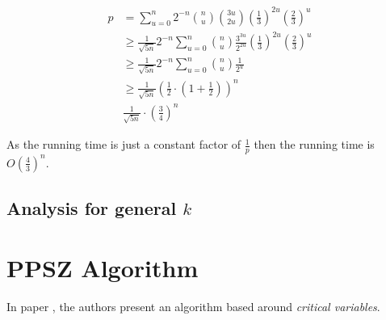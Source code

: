 \documentclass[12pt, a4paper]{article}
\theoremstyle{definition}
\begin{document}
\begin{align}
	p 	&= \sum_{u = 0}^{n} 2^{-n} \binom{n}{u} \binom{3u}{2u} \left( \frac{1}{3} \right)^{2u} \left( \frac{2}{3} \right)^u \\
	 	&\geq \frac{1}{\sqrt{5n}} 2^{-n}\sum_{u = 0}^{n} \binom{n}{u} \frac{3^{3u}}{2^{2u}} \left( \frac{1}{3} \right)^{2u} \left( \frac{2}{3} \right)^u \\
	 	&\geq \frac{1}{\sqrt{5n}} 2^{-n}\sum_{u = 0}^{n} \binom{n}{u} \frac{1}{2^u} \\
	 	&\geq \frac{1}{\sqrt{5n}} \left(\frac{1}{2} \cdot \left(1 + \frac{1}{2} \right) \right)^n \\
	 	& \frac{1}{\sqrt{5n}} \cdot \left( \frac{3}{4} \right)^n
\end{align}

As the running time is just a constant factor of $\frac{1}{p}$ then the running time is $O\left(\frac{4}{3} \right)^n$.
	
\subsection{Analysis for general $k$}

\section{PPSZ Algorithm}

In paper \cite{paturi98an-improved}, the authors present an algorithm based around \textit{critical variables}.




\end{document}
